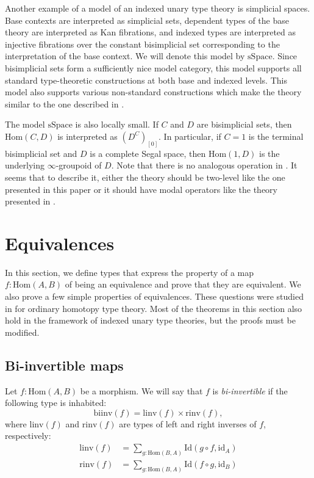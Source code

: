 \documentclass[reqno]{mscs}
\newcommand{\fs}[1]{\mathrm{#1}}
\newcommand{\Hom}{\fs{Hom}}
\newcommand{\Id}{\fs{Id}}
\newcommand{\id}{\fs{id}}
\newcommand{\sSpace}{\fs{sSpace}}
\numberwithin{figure}{section}
\begin{document}
Another example of a model of an indexed unary type theory is simplicial spaces.
Base contexts are interpreted as simplicial sets, dependent types of the base theory are interpreted as Kan fibrations,
and indexed types are interpreted as injective fibrations over the constant bisimplicial set corresponding to the interpretation of the base context.
We will denote this model by $\sSpace$.
Since bisimplicial sets form a sufficiently nice model category, this model supports all standard type-theoretic constructions at both base and indexed levels.
This model also supports various non-standard constructions which make the theory similar to the one described in \cite{riehl-dhott}.

The model $\sSpace$ is also locally small.
If $C$ and $D$ are bisimplicial sets, then $\Hom(C,D)$ is interpreted as $(D^C)_{[0]}$.
In particular, if $C = 1$ is the terminal bisimplicial set and $D$ is a complete Segal space, then $\Hom(1,D)$ is the underlying $\infty$-groupoid of $D$.
Note that there is no analogous operation in \cite{riehl-dhott}.
It seems that to describe it, either the theory should be two-level like the one presented in this paper or it should have modal operators like the theory presented in \cite{cohesive-hott}.

\section{Equivalences}
\label{sec:equivalence}

In this section, we define types that express the property of a map $f : \Hom(A,B)$ of being an equivalence and prove that they are equivalent.
We also prove a few simple properties of equivalences.
These questions were studied in \cite[Section~4]{hottbook} for ordinary homotopy type theory.
Most of the theorems in this section also hold in the framework of indexed unary type theories, but the proofs must be modified.

\subsection{Bi-invertible maps}

Let $f : \Hom(A,B)$ be a morphism.
We will say that $f$ is \emph{bi-invertible} if the following type is inhabited:
\[ \fs{biinv}(f) = \fs{linv}(f) \times \fs{rinv}(f), \]
where $\fs{linv}(f)$ and $\fs{rinv}(f)$ are types of left and right inverses of $f$, respectively:
\begin{align*}
\fs{linv}(f) & = \sum_{g : \Hom(B,A)} \Id(g \circ f, \id_A) \\
\fs{rinv}(f) & = \sum_{g : \Hom(B,A)} \Id(f \circ g, \id_B)
\end{align*}
\end{document}
